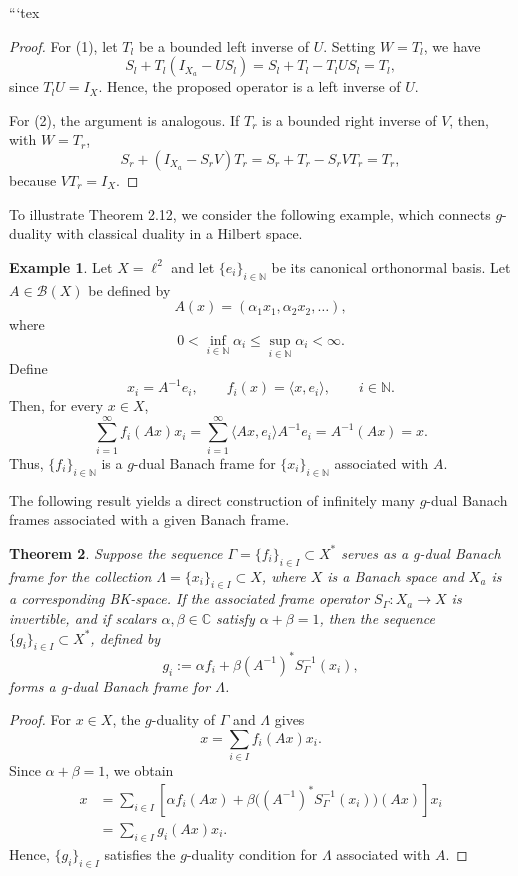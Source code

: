 \documentclass[12pt]{article}
\newtheorem{theorem}{Theorem}[section]
\theoremstyle{definition}
\newtheorem{example}[theorem]{Example}
\theoremstyle{remark}
\begin{document}
```tex
\begin{proof}
	For (1), let \(T_l\) be a bounded left inverse of \(U\). Setting
	\(W=T_l\), we have
	\[
	S_l+T_l(I_{X_a}-US_l)
	=S_l+T_l-T_lUS_l
	=T_l,
	\]
	since \(T_lU=I_X\). Hence, the proposed operator is a left inverse of \(U\).
	
	For (2), the argument is analogous. If \(T_r\) is a bounded right inverse
	of \(V\), then, with \(W=T_r\),
	\[
	S_r+(I_{X_a}-S_rV)T_r
	=S_r+T_r-S_rVT_r
	=T_r,
	\]
	because \(VT_r=I_X\).
\end{proof}

\noindent
To illustrate Theorem 2.12, we consider the following example, which
connects \(g\)-duality with classical duality in a Hilbert space.

\begin{example}
	Let \(X=\ell^2\) and let \(\{e_i\}_{i\in\mathbb{N}}\) be its canonical
	orthonormal basis. Let \(A\in\mathcal{B}(X)\) be defined by
	\[
	A(x)=(\alpha_1x_1,\alpha_2x_2,\ldots),
	\]
	where
	\[
	0<\inf_{i\in\mathbb{N}}\alpha_i
	\leq\sup_{i\in\mathbb{N}}\alpha_i<\infty.
	\]
	Define
	\[
	x_i=A^{-1}e_i,\qquad
	f_i(x)=\langle x,e_i\rangle,
	\qquad i\in\mathbb{N}.
	\]
	Then, for every \(x\in X\),
	\[
	\sum_{i=1}^{\infty}f_i(Ax)x_i
	=\sum_{i=1}^{\infty}
	\langle Ax,e_i\rangle A^{-1}e_i
	=A^{-1}(Ax)
	=x.
	\]
	Thus, \(\{f_i\}_{i\in\mathbb{N}}\) is a \(g\)-dual Banach frame for
	\(\{x_i\}_{i\in\mathbb{N}}\) associated with \(A\).
\end{example}

The following result yields a direct construction of infinitely many
\(g\)-dual Banach frames associated with a given Banach frame.

\begin{theorem}
Suppose the sequence \( \Gamma = \{f_i\}_{i \in I} \subset X^* \) serves as a g-dual Banach frame for the collection \( \Lambda = \{x_i\}_{i \in I} \subset X \), where \( X \) is a Banach space and \( X_a \) is a corresponding BK-space. If the associated frame operator \( S_\Gamma : X_a \rightarrow X \) is invertible, and if scalars \( \alpha, \beta \in \mathbb{C} \) satisfy \( \alpha + \beta = 1 \), then the sequence \( \{g_i\}_{i \in I} \subset X^* \), defined by
\[
g_i := \alpha f_i + \beta (A^{-1})^* S_\Gamma^{-1}(x_i),
\]
forms a g-dual Banach frame for \( \Lambda \).
\end{theorem}
\begin{proof}
	For \(x\in X\), the \(g\)-duality of \(\Gamma\) and \(\Lambda\) gives
	\[
	x=\sum_{i\in I}f_i(Ax)x_i.
	\]
	Since \(\alpha+\beta=1\), we obtain
	\[
	\begin{aligned}
		x
		&=\sum_{i\in I}
		\left[\alpha f_i(Ax)
		+\beta\bigl((A^{-1})^*S_\Gamma^{-1}(x_i)\bigr)(Ax)\right]x_i\\
		&=\sum_{i\in I}g_i(Ax)x_i.
	\end{aligned}
	\]
	Hence, \(\{g_i\}_{i\in I}\) satisfies the \(g\)-duality condition for
	\(\Lambda\) associated with \(A\).
\end{proof}
\end{document}
